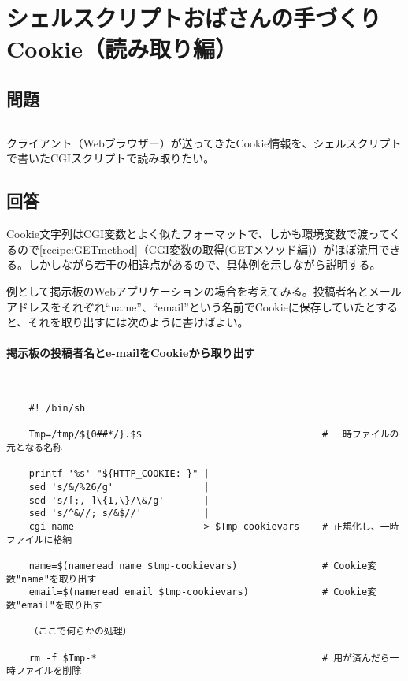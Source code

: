 \section{シェルスクリプトおばさんの手づくりCookie（読み取り編）}
\label{recipe:read_cookie}

\subsection*{問題}
\noindent
$\!\!\!\!\!$
\begin{grshfboxit}{160.0mm}
	クライアント（Webブラウザー）が送ってきたCookie情報を、シェルスクリプトで書いたCGIスクリプトで読み取りたい。
\end{grshfboxit}

\subsection*{回答}
Cookie文字列はCGI変数とよく似たフォーマットで、しかも環境変数で渡ってくるので\ref{recipe:GETmethod}（CGI変数の取得(GETメソッド編)）がほぼ流用できる。しかしながら若干の相違点があるので、具体例を示しながら説明する。

例として掲示板のWebアプリケーションの場合を考えてみる。投稿者名とメールアドレスをそれぞれ``name''、``email''という名前でCookieに保存していたとすると、それを取り出すには次のように書けばよい。
\paragraph{掲示板の投稿者名とe-mailをCookieから取り出す} 　\\
\begin{frameboxit}{160.0mm}
\begin{verbatim}
	#! /bin/sh
	
	Tmp=/tmp/${0##*/}.$$                                # 一時ファイルの元となる名称
	
	printf '%s' "${HTTP_COOKIE:-}" |
	sed 's/&/%26/g'                |
	sed 's/[;, ]\{1,\}/\&/g'       |
	sed 's/^&//; s/&$//'           |
	cgi-name                       > $Tmp-cookievars    # 正規化し、一時ファイルに格納
	
	name=$(nameread name $tmp-cookievars)               # Cookie変数"name"を取り出す
	email=$(nameread email $tmp-cookievars)             # Cookie変数"email"を取り出す
	
	（ここで何らかの処理）
	
	rm -f $Tmp-*                                        # 用が済んだら一時ファイルを削除
\end{verbatim}
\end{frameboxit}

